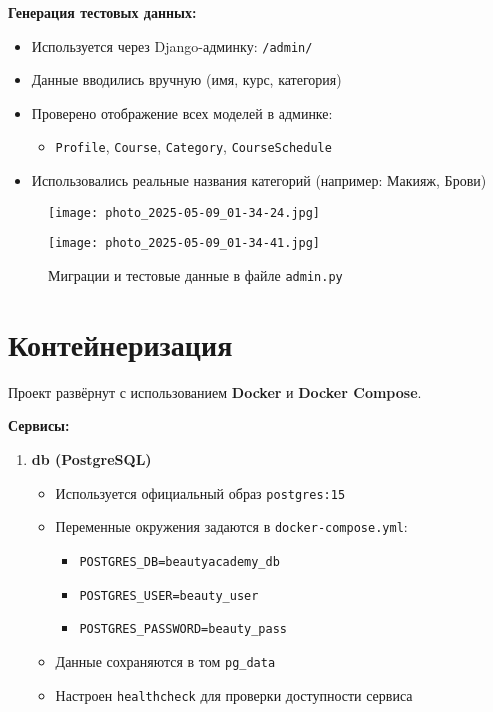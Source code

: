 \documentclass[a4paper,12pt]{article}
\begin{document}
\begin{itemize}[leftmargin=1.2cm]
\textbf{Генерация тестовых данных:}

\begin{itemize}
    \item Используется через Django-админку: \texttt{/admin/}
    \item Данные вводились вручную (имя, курс, категория)
    \item Проверено отображение всех моделей в админке:
    \begin{itemize}
        \item \texttt{Profile}, \texttt{Course}, \texttt{Category}, \texttt{CourseSchedule}
    \end{itemize}
    \item Использовались реальные названия категорий (например: Макияж, Брови)
\end{itemize}

\begin{figure}[H]
    \centering
    \texttt{[image: photo\_2025-05-09\_01-34-24.jpg]}
    \label{fig:nginx-config}
\end{figure}

\begin{figure}[H]
    \centering
    \texttt{[image: photo\_2025-05-09\_01-34-41.jpg]}
    \caption{Миграции и тестовые данные в файле \texttt{admin.py}}
    \label{fig:nginx-config}
\end{figure}

\section{Контейнеризация}

Проект развёрнут с использованием \textbf{Docker} и \textbf{Docker Compose}.

\vspace{1em}
\textbf{Сервисы:}

\begin{enumerate}
    \item \textbf{db (PostgreSQL)}
    \begin{itemize}
        \item Используется официальный образ \texttt{postgres:15}
        \item Переменные окружения задаются в \texttt{docker-compose.yml}:
        \begin{itemize}
            \item \texttt{POSTGRES_DB=beautyacademy\_db}
            \item \texttt{POSTGRES_USER=beauty\_user}
            \item \texttt{POSTGRES_PASSWORD=beauty\_pass}
        \end{itemize}
        \item Данные сохраняются в том \texttt{pg\_data}
        \item Настроен \texttt{healthcheck} для проверки доступности сервиса
    \end{itemize}


\end{enumerate}
\end{itemize}
\end{document}
